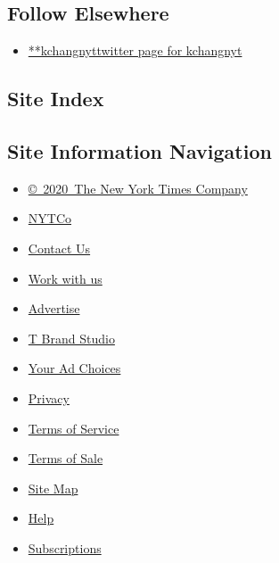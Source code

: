 \hypertarget{follow-elsewhere}{%
\subsection{Follow Elsewhere}\label{follow-elsewhere}}

\begin{itemize}
\tightlist
\item
  \href{https://twitter.com/kchangnyt}{**kchangnyttwitter page for
  kchangnyt}
\end{itemize}

\hypertarget{site-index}{%
\subsection{Site Index}\label{site-index}}

\hypertarget{site-information-navigation}{%
\subsection{Site Information
Navigation}\label{site-information-navigation}}

\begin{itemize}
\tightlist
\item
  \href{https://help.nytimes.com/hc/en-us/articles/115014792127-Copyright-notice}{©~2020~The
  New York Times Company}
\end{itemize}

\begin{itemize}
\tightlist
\item
  \href{https://www.nytco.com/}{NYTCo}
\item
  \href{https://help.nytimes.com/hc/en-us/articles/115015385887-Contact-Us}{Contact
  Us}
\item
  \href{https://www.nytco.com/careers/}{Work with us}
\item
  \href{https://nytmediakit.com/}{Advertise}
\item
  \href{http://www.tbrandstudio.com/}{T Brand Studio}
\item
  \href{https://www.nytimes.com/privacy/cookie-policy\#how-do-i-manage-trackers}{Your
  Ad Choices}
\item
  \href{https://www.nytimes.com/privacy}{Privacy}
\item
  \href{https://help.nytimes.com/hc/en-us/articles/115014893428-Terms-of-service}{Terms
  of Service}
\item
  \href{https://help.nytimes.com/hc/en-us/articles/115014893968-Terms-of-sale}{Terms
  of Sale}
\item
  \href{https://spiderbites.nytimes.com}{Site Map}
\item
  \href{https://help.nytimes.com/hc/en-us}{Help}
\item
  \href{https://www.nytimes.com/subscription?campaignId=37WXW}{Subscriptions}
\end{itemize}
